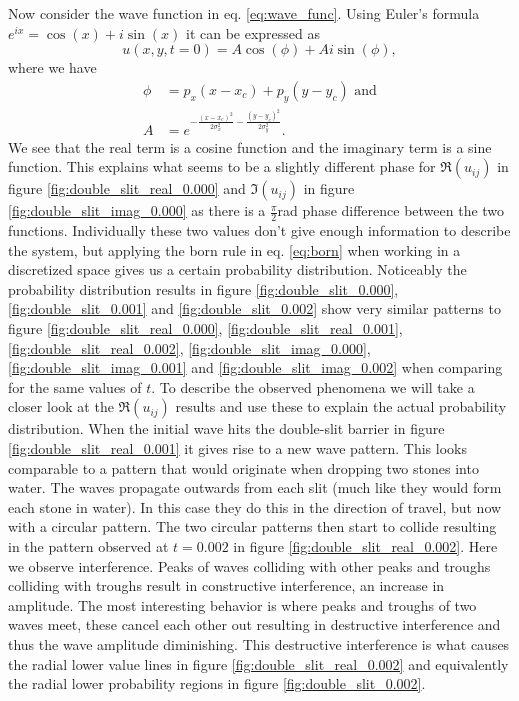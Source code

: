 \documentclass[english,notitlepage,reprint,nofootinbib]{revtex4-1}  %
\begin{document}

Now consider the wave function in eq. \ref{eq:wave_func}. Using Euler's formula $e^{ix} = \cos(x) + i \sin(x)$ it can be expressed as
\begin{equation}
    u(x,y,t = 0) = A \cos(\phi) + A i \sin(\phi),
\end{equation}
where we have
\begin{align}
    \phi & = p_x (x-x_c)+ p_y (y-y_c) \text{  and} \\ A &= e^{-\frac{(x-x_c)^2}{2 \sigma_x^2} -\frac{(y-y_c)^2}{2 \sigma_y^2}}.
\end{align}
We see that the real term is a cosine function and the imaginary term is a sine function. This explains what seems to be a slightly different phase for $\Re(u_{ij})$ in figure \ref{fig:double_slit_real_0.000} and $\Im(u_{ij})$ in figure \ref{fig:double_slit_imag_0.000} as there is a $\frac{\pi}{2}$rad phase difference between the two functions. Individually these two values don't give enough information to describe the system, but applying the born rule in eq. \ref{eq:born} when working in a discretized space gives us a certain probability distribution. Noticeably the probability distribution results in figure \ref{fig:double_slit_0.000}, \ref{fig:double_slit_0.001} and \ref{fig:double_slit_0.002} show very similar patterns to figure \ref{fig:double_slit_real_0.000}, \ref{fig:double_slit_real_0.001}, \ref{fig:double_slit_real_0.002}, \ref{fig:double_slit_imag_0.000}, \ref{fig:double_slit_imag_0.001} and \ref{fig:double_slit_imag_0.002} when comparing for the same values of $t$. To describe the observed phenomena we will take a closer look at the $\Re(u_{ij})$ results and use these to explain the actual probability distribution. When the initial wave hits the double-slit barrier in figure \ref{fig:double_slit_real_0.001} it gives rise to a new wave pattern. This looks comparable to a pattern that would originate when dropping two stones into water. The waves propagate outwards from each slit (much like they would form each stone in water). In this case they do this in the direction of travel, but now with a circular pattern. The two circular patterns then start to collide resulting in the pattern observed at $t = 0.002$ in figure \ref{fig:double_slit_real_0.002}. Here we observe interference. Peaks of waves colliding with other peaks and troughs colliding with troughs result in constructive interference, an increase in amplitude. The most interesting behavior is where peaks and troughs of two waves meet, these cancel each other out resulting in destructive interference and thus the wave amplitude diminishing. This destructive interference is what causes the radial lower value lines in figure \ref{fig:double_slit_real_0.002} and equivalently the radial lower probability regions in figure \ref{fig:double_slit_0.002}.
\end{document}
